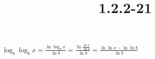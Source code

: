 \documentclass{article}
\title{1.2.2-21}
\begin{document}
\maketitle

\( \log_b{\log_b{x}} = \frac{\ln{\log_b{x}}}{\ln{b}} = \frac{\ln{\frac{\ln{x}}{\ln{b}}}}{\ln{b}} = \frac{\ln{\ln{x}} - \ln{\ln{b}}}{\ln{b}} \)
\end{document}
